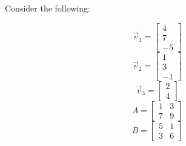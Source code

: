 
Consider the following:

$$\vec{v}_1 = \begin{bmatrix} 4 \\ 7 \\ -5 \end{bmatrix}$$
$$\vec{v}_2 = \begin{bmatrix} 1 \\ 3 \\ -1 \end{bmatrix}$$
$$\vec{v}_3 = \begin{bmatrix} 2 \\ 4 \end{bmatrix}$$
$$A = \begin{bmatrix} 1 & 3 \\7 & 9 \end{bmatrix}$$
$$B = \begin{bmatrix} 5 & 1 \\3 & 6 \end{bmatrix}$$


